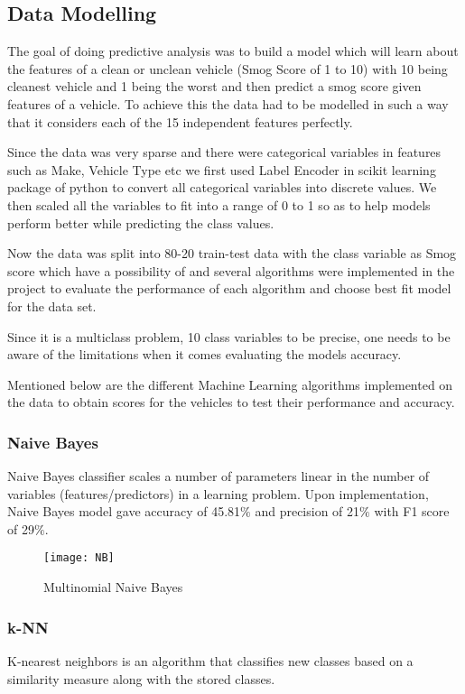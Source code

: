 \documentclass{acm_proc_article-sp}
\begin{document}
\subsection{Data Modelling}
The goal of doing predictive analysis was to build a model which will learn about the features of a clean or unclean vehicle (Smog Score of 1 to 10) with 10 being cleanest vehicle and 1 being the worst and then predict a smog score given features of a vehicle. To achieve this the data had to be modelled in such a way that it considers each of the 15 independent features perfectly.

Since the data was very sparse and there were categorical variables in features such as Make, Vehicle Type etc we first used Label Encoder in scikit learning package of python to convert all categorical variables into discrete values. We then scaled all the variables to fit into a range of 0 to 1 so as to help models perform better while predicting the class values.

Now the data was split into 80-20 train-test data with the class variable as Smog score which have a possibility of  and several algorithms were implemented in the project to evaluate the performance of each algorithm and choose best fit model for the data set.

Since it is a multiclass problem, 10 class variables to be precise, one needs to be aware of the limitations when it comes evaluating the models accuracy. 

Mentioned below are the different Machine Learning algorithms implemented on the data to obtain scores for the vehicles to test their performance and accuracy.

\subsubsection{Naive Bayes}
Naive Bayes classifier scales a number of parameters linear in the number of variables (features/predictors) in a learning problem. Upon implementation, Naive Bayes model gave accuracy of 45.81$\%$ and precision of 21$\%$ with F1 score of 29$\%$. \\

\begin{figure}[H]
\centering
\texttt{[image: NB]}
\caption{Multinomial Naive Bayes}
\end{figure}

\subsubsection{k-NN}
K-nearest neighbors is an algorithm that classifies new classes  based on a similarity measure along with the stored classes. 
\end{document}
